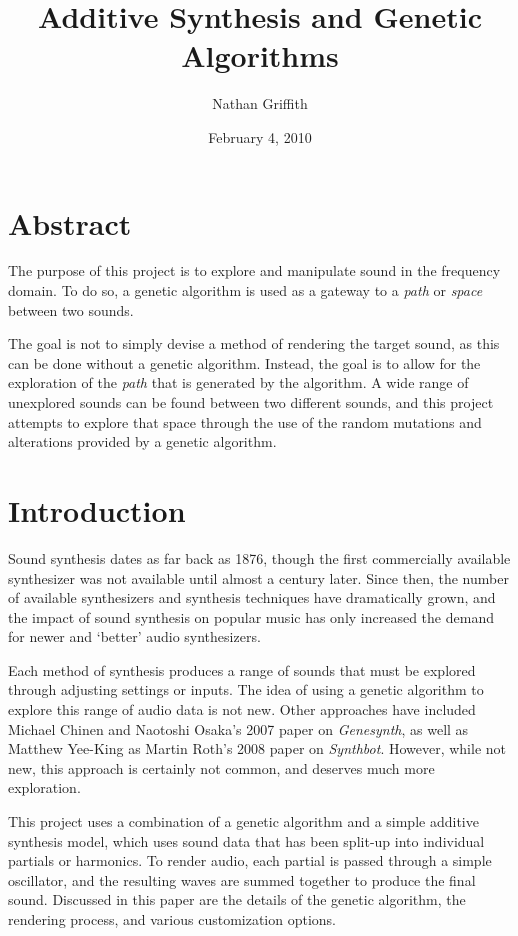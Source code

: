 \documentclass[11pt]{article}
\title{Additive Synthesis and Genetic Algorithms}
\author{Nathan  Griffith}
\date{February 4, 2010}
\begin{document}
\maketitle %

\section{Abstract}

The purpose of this project is to explore and manipulate sound in the frequency domain. To do so, a genetic algorithm is used as a gateway to a \emph{path} or \emph{space} between two sounds. 

The goal is not to simply devise a method of rendering the target sound, as this can be done without a genetic algorithm. Instead, the goal is to allow for the exploration of the \emph{path} that is generated by the algorithm. A wide range of unexplored sounds can be found between two different sounds, and this project attempts to explore that space through the use of the random mutations and alterations provided by a genetic algorithm. 

\section{Introduction}

Sound synthesis dates as far back as 1876, though the first commercially available synthesizer was not available until almost a century later. Since then, the number of available synthesizers and synthesis techniques have dramatically grown, and the impact of sound synthesis on popular music has only increased the demand for newer and `better' audio synthesizers.

Each method of synthesis produces a range of sounds that must be explored through adjusting settings or inputs. The idea of using a genetic algorithm to explore this range of audio data is not new. Other approaches have included Michael Chinen and Naotoshi Osaka's 2007 paper on \emph{Genesynth}\cite{genesynth}, as well as Matthew Yee-King as Martin Roth's 2008 paper on \emph{Synthbot}\cite{synthbot}. However, while not new, this approach is certainly not common, and deserves much more exploration.

This project uses a combination of a genetic algorithm and a simple additive synthesis model, which uses sound data that has been split-up into individual partials or harmonics. To render audio, each partial is passed through a simple oscillator, and the resulting waves are summed together to produce the final sound. Discussed in this paper are the details of the genetic algorithm, the rendering process, and various customization options.
\end{document}
